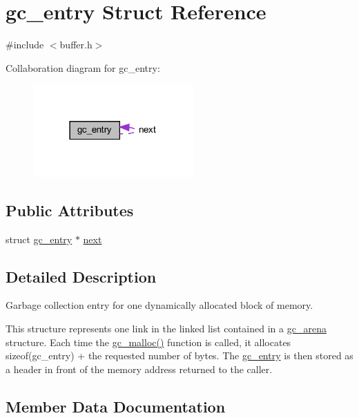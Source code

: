 \hypertarget{structgc__entry}{}\section{gc\+\_\+entry Struct Reference}
\label{structgc__entry}


{\ttfamily \#include $<$buffer.\+h$>$}



Collaboration diagram for gc\+\_\+entry\+:
\nopagebreak
\begin{figure}[H]
\begin{center}
\leavevmode
\includegraphics[width=174pt]{structgc__entry__coll__graph}
\end{center}
\end{figure}
\subsection*{Public Attributes}
\begin{DoxyCompactItemize}
\item 
struct \hyperlink{structgc__entry}{gc\+\_\+entry} $\ast$ \hyperlink{structgc__entry_aaaabb4fc817fb42dbb821979b5981dc3}{next}
\end{DoxyCompactItemize}


\subsection{Detailed Description}
Garbage collection entry for one dynamically allocated block of memory.

This structure represents one link in the linked list contained in a {\ttfamily \hyperlink{structgc__arena}{gc\+\_\+arena}} structure. Each time the {\ttfamily \hyperlink{buffer_8c_a67f7dec7f86e113dc0744584fd80b621}{gc\+\_\+malloc()}} function is called, it allocates {\ttfamily sizeof(gc\+\_\+entry)} + the requested number of bytes. The {\ttfamily \hyperlink{structgc__entry}{gc\+\_\+entry}} is then stored as a header in front of the memory address returned to the caller. 

\subsection{Member Data Documentation}
\hypertarget{structgc__entry_aaaabb4fc817fb42dbb821979b5981dc3}{}
